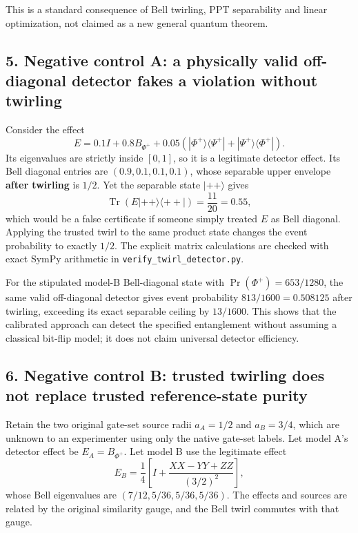 \documentclass[
  10pt,
  a4paper,
]{article}
\begin{document}
This is a standard consequence of Bell twirling, PPT separability and linear optimization, not claimed as a new general quantum theorem.

\subsection{5. Negative control A: a physically valid off-diagonal detector fakes a violation without twirling}\label{negative-control-a-a-physically-valid-off-diagonal-detector-fakes-a-violation-without-twirling}

Consider the effect \[
 E=0.1I+0.8B_{\Phi^+}+0.05(|\Phi^+\rangle\langle\Psi^+|+|\Psi^+\rangle\langle\Phi^+|).
\] Its eigenvalues are strictly inside \([0,1]\), so it is a legitimate detector effect. Its Bell diagonal entries are \((0.9,0.1,0.1,0.1)\), whose separable upper envelope \textbf{after twirling} is \(1/2\). Yet the separable state \(|++\rangle\) gives \[
 \operatorname{Tr}(E|++\rangle\langle++|)=\frac{11}{20}=0.55,
\] which would be a false certificate if someone simply treated \(E\) as Bell diagonal. Applying the trusted twirl to the same product state changes the event probability to exactly \(1/2\). The explicit matrix calculations are checked with exact SymPy arithmetic in \texttt{verify\_twirl\_detector.py}.

For the stipulated model-B Bell-diagonal state with \(\Pr(\Phi^+)=653/1280\), the same valid off-diagonal detector gives event probability \(813/1600=0.508125\) after twirling, exceeding its exact separable ceiling by \(13/1600\). This shows that the calibrated approach can detect the specified entanglement without assuming a classical bit-flip model; it does not claim universal detector efficiency.

\subsection{6. Negative control B: trusted twirling does not replace trusted reference-state purity}\label{negative-control-b-trusted-twirling-does-not-replace-trusted-reference-state-purity}

Retain the two original gate-set source radii \(a_A=1/2\) and \(a_B=3/4\), which are unknown to an experimenter using only the native gate-set labels. Let model A's detector effect be \(E_A=B_{\Phi^+}\). Let model B use the legitimate effect \[
 E_B=\frac14\left[I+\frac{XX-YY+ZZ}{(3/2)^2}\right],
\] whose Bell eigenvalues are \((7/12,5/36,5/36,5/36)\). The effects and sources are related by the original similarity gauge, and the Bell twirl commutes with that gauge.
\end{document}
